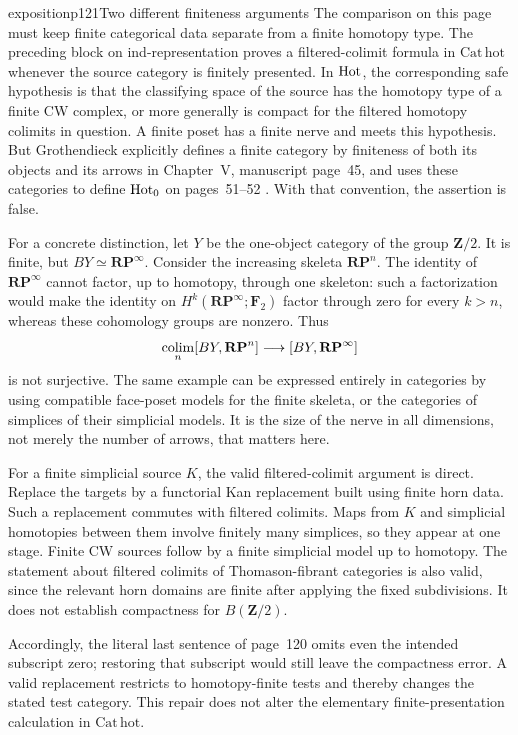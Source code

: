 \begin{dcomment}{exposition}{p121}{Two different finiteness arguments}
The comparison on this page must keep finite categorical data separate from a finite homotopy type. The preceding block on ind-representation proves a filtered-colimit formula in $\mathrm{Cat\,hot}$ whenever the source category is finitely presented. In $\mathrm{Hot}$, the corresponding safe hypothesis is that the classifying space of the source has the homotopy type of a finite CW complex, or more generally is compact for the filtered homotopy colimits in question. A finite poset has a finite nerve and meets this hypothesis. But Grothendieck explicitly defines a finite category by finiteness of both its objects and its arrows in Chapter~V, manuscript page~45, and uses these categories to define $\mathrm{Hot}_0$ on pages~51--52 \citep{Grothendieck1990V}. With that convention, the assertion is false.

For a concrete distinction, let $Y$ be the one-object category of the group $\mathbf Z/2$. It is finite, but $BY\simeq\mathbf{RP}^{\infty}$. Consider the increasing skeleta $\mathbf{RP}^n$. The identity of $\mathbf{RP}^{\infty}$ cannot factor, up to homotopy, through one skeleton: such a factorization would make the identity on $H^k(\mathbf{RP}^{\infty};\mathbf F_2)$ factor through zero for every $k>n$, whereas these cohomology groups are nonzero. Thus
\[
 \mathop{\rm colim}_n[BY,\mathbf{RP}^n]
       \longrightarrow[BY,\mathbf{RP}^{\infty}]
\]
is not surjective. The same example can be expressed entirely in categories by using compatible face-poset models for the finite skeleta, or the categories of simplices of their simplicial models. It is the size of the nerve in all dimensions, not merely the number of arrows, that matters here.

For a finite simplicial source $K$, the valid filtered-colimit argument is direct. Replace the targets by a functorial Kan replacement built using finite horn data. Such a replacement commutes with filtered colimits. Maps from $K$ and simplicial homotopies between them involve finitely many simplices, so they appear at one stage. Finite CW sources follow by a finite simplicial model up to homotopy. The statement about filtered colimits of Thomason-fibrant categories is also valid, since the relevant horn domains are finite after applying the fixed subdivisions. It does not establish compactness for $B(\mathbf Z/2)$.

Accordingly, the literal last sentence of page~120 omits even the intended subscript zero; restoring that subscript would still leave the compactness error. A valid replacement restricts to homotopy-finite tests and thereby changes the stated test category. This repair does not alter the elementary finite-presentation calculation in $\mathrm{Cat\,hot}$.
\end{dcomment}


